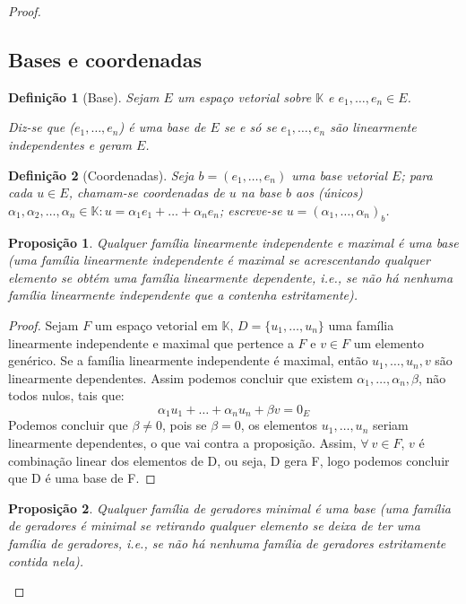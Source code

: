 \documentclass{article}
\newtheorem{proposition}{Proposição}[section]
\newtheorem{definition}{Definição}[section]
\begin{document}
\begin{proof}
\subsection{Bases e coordenadas}

	\begin{definition}[Base]

		Sejam $E$ um espaço vetorial sobre $\mathbb{K}$ e $e_1,\dots,e_n \in E$.

		Diz-se que ($e_1,\dots,e_n$) é uma base de $E$ se e só se $e_1,\dots,e_n$ são linearmente independentes e geram $E$.

	\end{definition}

	\begin{definition}[Coordenadas]

		Seja $b=(e_1,\dots,e_n)$ uma base vetorial $E$; para cada $u\in E$, chamam-se coordenadas de $u$ na base $b$ aos (únicos) $\alpha_1,\alpha_2,\dots,\alpha_n \in \mathbb{K}:u=\alpha_1 e_1+\dots+\alpha_n e_n$; escreve-se $u=(\alpha_1,\dots,\alpha_n)_b$.

	\end{definition}


	\begin{proposition}

		Qualquer família linearmente independente e maximal é uma base (uma família linearmente independente é maximal se acrescentando qualquer elemento se obtém uma família linearmente dependente, i.e., se não há nenhuma família linearmente independente que a contenha estritamente).

	\end{proposition}

	\begin{proof}
		Sejam $F$ um espaço vetorial em $\mathbb{K}$, $D=\{u_1,\dots,u_n\}$ uma família linearmente independente e maximal que pertence a $F$ e $v \in F$ um elemento genérico.
Se a família linearmente independente é maximal, então $u_1,\dots,u_n,v$ são linearmente dependentes. Assim podemos concluir que existem $\alpha_1,\dots,\alpha_n,\beta$, não todos nulos, tais que: $$
		\alpha_1u_1+\dots+\alpha_nu_n+\beta v=0_E$$
		Podemos concluir que $\beta \neq 0$, pois se $\beta=0$, os elementos $u_1,\dots,u_n$ seriam linearmente dependentes, o que vai contra a proposição. Assim, $\forall \ v \in F$, $v$ é combinação linear dos elementos de D, ou seja, D gera F, logo podemos concluir que D é uma base de F.
	\end{proof}

	\begin{proposition}
	Qualquer família de geradores minimal é uma base (uma família de geradores é minimal se retirando qualquer elemento se deixa de ter uma família de geradores, i.e., se não há nenhuma família de geradores estritamente contida nela).


\end{proposition}
\end{proof}
\end{document}
